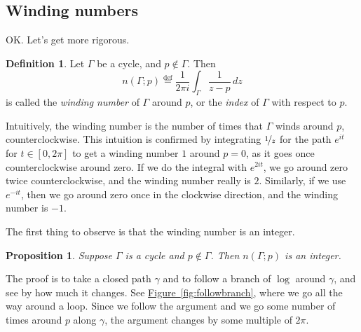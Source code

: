 \documentclass[12pt,openany]{book}
\newcommand{\avoidbreak}{\postdisplaypenalty=100}
\newcommand{\myindex}[1]{#1\index{#1}}
\theoremstyle{plain}
\newtheorem{prop}[thm]{Proposition}
\theoremstyle{remark}
\theoremstyle{definition}
\newtheorem{defn}[thm]{Definition}
\theoremstyle{exercise}
\theoremstyle{example}
\newcommand{\figureref}[1]{\hyperref[#1]{Figure~\ref*{#1}}}
\begin{document}
\subsection{Winding numbers}

OK\@.  Let's get more rigorous.

\begin{defn}\label{defn:windingnumber}
Let $\Gamma$ be
a cycle,
and $p \notin \Gamma$.  Then
%
\begin{equation*}
n(\Gamma;p)
\overset{\text{def}}{=}
\frac{1}{2\pi i} \int_\Gamma \frac{1}{z-p} \, dz
\end{equation*}
is called the
\emph{\myindex{winding number}} of $\Gamma$ around $p$, or
the 
\emph{\myindex{index}} of $\Gamma$ with respect to $p$.
\end{defn}

Intuitively, the winding number is the number of times that $\Gamma$ winds
around $p$, counterclockwise.  This intuition is confirmed by integrating
$\nicefrac{1}{z}$ for the path $e^{it}$ for $t \in [0,2\pi]$ to get
a winding number $1$ around $p=0$,
as it goes once counterclockwise around zero.  If we do
the integral with $e^{2it}$, we go around zero twice 
counterclockwise, and the winding number really is $2$.  Similarly,
if we use $e^{-it}$, then we go around zero once in the
clockwise direction, and the winding number is $-1$.

The first thing to observe is that the winding number is an integer.

\begin{prop} \label{prop:indexinteger}
Suppose $\Gamma$ is a cycle and $p \notin \Gamma$.  Then
$n(\Gamma;p)$ is an integer.
\end{prop}

The proof is to take a closed path $\gamma$
and to follow a branch of $\log$ around $\gamma$, and
see by how much it changes.  See \figureref{fig:followbranch}, where we
go all the way around a loop.  Since we follow the argument
and we go some number of times around $p$ along $\gamma$, the
argument changes by some multiple of $2\pi$.
\end{document}

